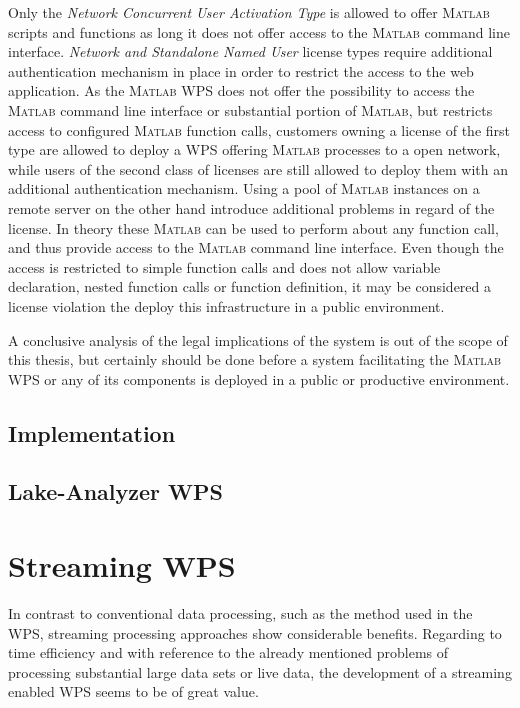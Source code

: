 		Only the \emph{Network Concurrent User Activation Type} is allowed to offer \textsc{Matlab} scripts and functions as long it does not offer access to the \textsc{Matlab} command line interface. \emph{Network and Standalone Named User} license types require additional authentication mechanism in place in order to restrict the access to the web application. As the \textsc{Matlab} WPS does not offer the possibility to access the \textsc{Matlab} command line interface or substantial portion of \textsc{Matlab}, but restricts access to configured \textsc{Matlab} function calls, customers owning a license of the first type are allowed to deploy a \ac{WPS} offering \textsc{Matlab} processes to a open network, while users of the second class of licenses are still allowed to deploy them with an additional authentication mechanism. Using a pool of \textsc{Matlab} instances on a remote server on the other hand introduce additional problems in regard of the license. In theory these \textsc{Matlab} can be used to perform about any function call, and thus provide access to the \textsc{Matlab} command line interface. Even though the access is restricted to simple function calls and does not allow variable declaration, nested function calls or function definition, it may be considered a license violation the deploy this infrastructure in a public environment.

		A conclusive analysis of the legal implications of the system is out of the scope of this thesis, but certainly should be done before a system facilitating the \textsc{Matlab} WPS or any of its components is deployed in a public or productive environment.
	\subsection{Implementation}

	\subsection{Lake-Analyzer WPS}
\section{Streaming WPS}
	In contrast to conventional data processing, such as the method used in the \ac{WPS}, streaming processing approaches show considerable benefits. Regarding to time efficiency and with reference to the already mentioned problems of processing substantial large data sets or live data, the development of a streaming enabled \ac{WPS} seems to be of great value.

